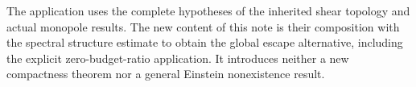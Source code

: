 \documentclass[
  11pt,
]{article}
\begin{document}
The application uses the complete hypotheses of the inherited shear
topology and actual monopole results. The new content of this note is
their composition with the spectral structure estimate to obtain the
global escape alternative, including the explicit zero-budget-ratio
application. It introduces neither a new compactness theorem nor a
general Einstein nonexistence result.
\end{document}
